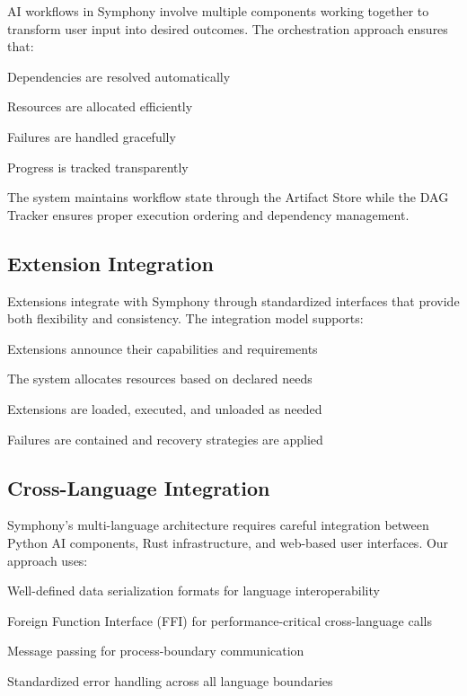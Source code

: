 AI workflows in Symphony involve multiple components working together to transform user input into desired outcomes. The orchestration approach ensures that:

\begin{compactlist}
    \item Dependencies are resolved automatically
    \item Resources are allocated efficiently
    \item Failures are handled gracefully
    \item Progress is tracked transparently
\end{compactlist}

The system maintains workflow state through the Artifact Store while the DAG Tracker ensures proper execution ordering and dependency management.

\subsection*{Extension Integration}

Extensions integrate with Symphony through standardized interfaces that provide both flexibility and consistency. The integration model supports:

\begin{description}[leftmargin=4cm,labelwidth=3.5cm]
    \item[\textbf{Capability Declaration}] Extensions announce their capabilities and requirements
    \item[\textbf{Resource Negotiation}] The system allocates resources based on declared needs
    \item[\textbf{Lifecycle Management}] Extensions are loaded, executed, and unloaded as needed
    \item[\textbf{Error Handling}] Failures are contained and recovery strategies are applied
\end{description}

\subsection*{Cross-Language Integration}

Symphony's multi-language architecture requires careful integration between Python AI components, Rust infrastructure, and web-based user interfaces. Our approach uses:

\begin{infobox}[title=Cross-Language Integration]
\begin{compactlist}
    \item Well-defined data serialization formats for language interoperability
    \item Foreign Function Interface (FFI) for performance-critical cross-language calls
    \item Message passing for process-boundary communication
    \item Standardized error handling across all language boundaries
\end{compactlist}
\end{infobox}

